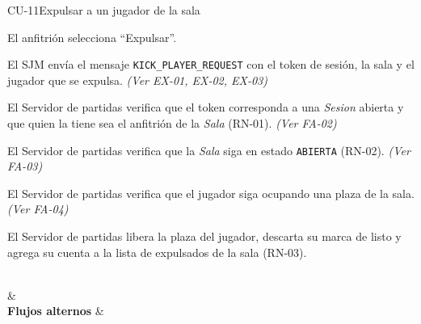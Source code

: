 \begin{fichacu}{CU-11}{Expulsar a un jugador de la sala}
{\begin{cuenum}[start=1]
      \item El anfitrión selecciona ``Expulsar''.
      \item El SJM envía el mensaje \texttt{KICK\_\allowbreak{}PLAYER\_\allowbreak{}REQUEST} con el token de sesión, la sala y el jugador que se expulsa. \textit{(Ver \mbox{EX-01}, \mbox{EX-02}, \mbox{EX-03})}
      \item El Servidor de partidas verifica que el token corresponda a una \textit{Sesion} abierta y que quien la tiene sea el anfitrión de la \textit{Sala} (\mbox{RN-01}). \textit{(Ver \mbox{FA-02})}
      \item El Servidor de partidas verifica que la \textit{Sala} siga en estado \texttt{ABIERTA} (\mbox{RN-02}). \textit{(Ver \mbox{FA-03})}
      \item El Servidor de partidas verifica que el jugador siga ocupando una plaza de la sala. \textit{(Ver \mbox{FA-04})}
      \item El Servidor de partidas libera la plaza del jugador, descarta su marca de listo y agrega su cuenta a la lista de expulsados de la sala (\mbox{RN-03}).
    \end{cuenum}} \\
   &  \\ \hline
  \textbf{Flujos alternos} & 
\end{fichacu}
